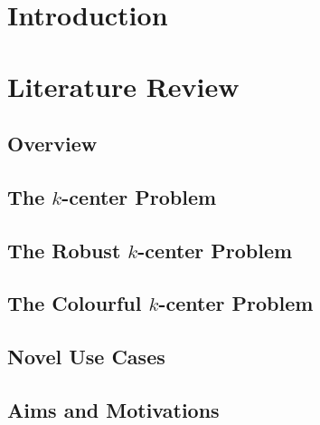 \documentclass{article}
\begin{document}

\newpage
\begin{abstract}

\end{abstract}
\newpage

\newpage
\tableofcontents
\newpage
\section{Introduction}


\section{Literature Review}\label{section:lit_review}

    \subsection{Overview}
    
    
    \subsection{The \texorpdfstring{$k$}{k}-center Problem}\label{section:k_center}
    
    
    \subsection{The Robust \texorpdfstring{$k$}{k}-center Problem}\label{section:robust_k_center}
    
    
    \subsection{The Colourful \texorpdfstring{$k$}{k}-center Problem}\label{section:colourful_k_center}
    
    
    \subsection{Novel Use Cases}
    
    
    \subsection{Aims and Motivations}
    
    \newpage
\end{document}

